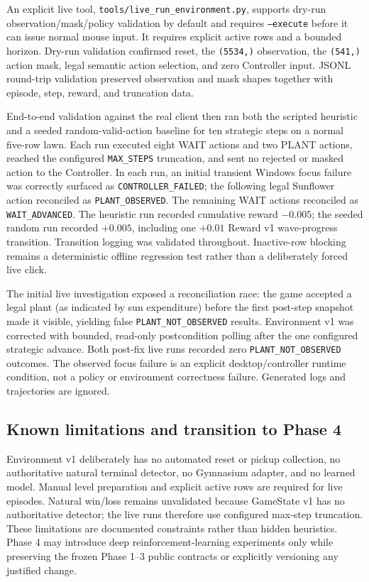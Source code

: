 \documentclass[11pt,a4paper]{article}
\begin{document}
An explicit live tool, \texttt{tools/live\_run\_environment.py}, supports dry-run observation/mask/policy validation by default and requires \texttt{--execute} before it can issue normal mouse input. It requires explicit active rows and a bounded horizon. Dry-run validation confirmed reset, the \texttt{(5534,)} observation, the \texttt{(541,)} action mask, legal semantic action selection, and zero Controller input. JSONL round-trip validation preserved observation and mask shapes together with episode, step, reward, and truncation data.

End-to-end validation against the real client then ran both the scripted heuristic and a seeded random-valid-action baseline for ten strategic steps on a normal five-row lawn. Each run executed eight WAIT actions and two PLANT actions, reached the configured \texttt{MAX\_STEPS} truncation, and sent no rejected or masked action to the Controller. In each run, an initial transient Windows focus failure was correctly surfaced as \texttt{CONTROLLER\_FAILED}; the following legal Sunflower action reconciled as \texttt{PLANT\_OBSERVED}. The remaining WAIT actions reconciled as \texttt{WAIT\_ADVANCED}. The heuristic run recorded cumulative reward $-0.005$; the seeded random run recorded $+0.005$, including one $+0.01$ Reward v1 wave-progress transition. Transition logging was validated throughout. Inactive-row blocking remains a deterministic offline regression test rather than a deliberately forced live click.

The initial live investigation exposed a reconciliation race: the game accepted a legal plant (as indicated by sun expenditure) before the first post-step snapshot made it visible, yielding false \texttt{PLANT\_NOT\_OBSERVED} results. Environment v1 was corrected with bounded, read-only postcondition polling after the one configured strategic advance. Both post-fix live runs recorded zero \texttt{PLANT\_NOT\_OBSERVED} outcomes. The observed focus failure is an explicit desktop/controller runtime condition, not a policy or environment correctness failure. Generated logs and trajectories are ignored.

\subsection{Known limitations and transition to Phase 4}
Environment v1 deliberately has no automated reset or pickup collection, no authoritative natural terminal detector, no Gymnasium adapter, and no learned model. Manual level preparation and explicit active rows are required for live episodes. Natural win/loss remains unvalidated because GameState v1 has no authoritative detector; the live runs therefore use configured max-step truncation. These limitations are documented constraints rather than hidden heuristics. Phase 4 may introduce deep reinforcement-learning experiments only while preserving the frozen Phase 1--3 public contracts or explicitly versioning any justified change.
\end{document}
